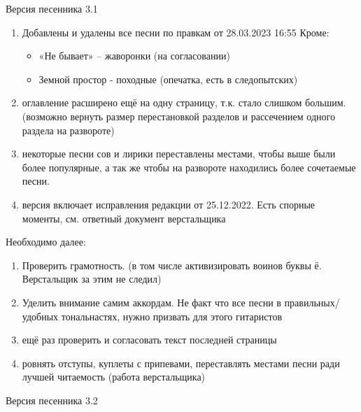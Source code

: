 \documentclass[fleqn,a5paper,12pt,twoside]{guitartabs}
\begin{document}
\setlength{\mathindent}{0pt}%
\setlength{\jot}{0mm}%
\setlength{\parindent}{0mm}%
\captionsetup[subfigure]{labelformat=empty} %
\sectionfont{\LARGE}
\sffamily

\setcounter{page}{0} %
Версия песенника 3.1
\begin{enumerate}
\item Добавлены и удалены все песни по правкам от 28.03.2023 16:55 Кроме:
\begin{itemize}
\item «Не бывает» – жаворонки (на согласовании)
\item Земной простор - походные (опечатка, есть в следопытских)
\end{itemize}
\item оглавление расширено ещё на одну страницу, т.к. стало слишком большим. (возможно вернуть размер перестановкой разделов и рассечением одного раздела на развороте)
\item некоторые песни сов и лирики переставлены местами, чтобы выше были более популярные, а так же чтобы на развороте находились более сочетаемые песни.
\item версия включает исправления редакции от 25.12.2022. Есть спорные моменты, см. ответный документ верстальщика
\end{enumerate}
Необходимо далее:
\begin{enumerate}
\item Проверить грамотность. (в том числе активизировать воинов буквы ё. Верстальщик за этим не следил)
\item Уделить внимание самим аккордам. Не факт что все песни в правильных/удобных тональнастях, нужно призвать для этого гитаристов
\item ещё раз проверить и согласовать текст последней страницы
\item ровнять отступы, куплеты с припевами, переставлять местами песни ради лучшей читаемость (работа верстальщика)
\end{enumerate}
\newpage
Версия песенника 3.2
\end{document}
